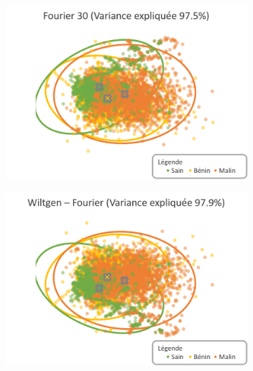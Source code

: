 \begin{figure}[p]
    \begin{subfigure}{.49\textwidth}
      \includegraphics[width=\textwidth]{contents/chapter_5/resources/visualisation_frequency_Fourier30.png}
    \end{subfigure}
    \begin{subfigure}{.49\textwidth}
      \includegraphics[width=\textwidth]{contents/chapter_5/resources/visualisation_frequency_WiltgenFourier.png}
    \end{subfigure}
    

\end{figure}
